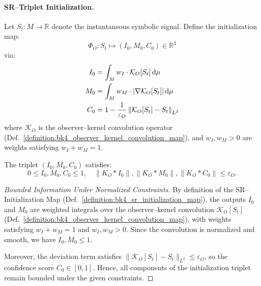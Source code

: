 \paragraph{SR--Triplet Initialization.}
\begin{definition}
\label{definition:bk4_sr_initialization_map}

Let $S_t \colon M \to \mathbb{R}$ denote the instantaneous symbolic signal.  
Define the initialization map:
\[
\Phi_O \colon S_t \longmapsto (I_0, M_0, C_0) \in \mathbb{R}^3
\]
via:
\begin{align}
I_0 &= \int_M w_I \cdot \mathcal{K}_O[S_t]\, \mathrm{d}\mu \notag \\
M_0 &= \int_M w_M \cdot |\nabla \mathcal{K}_O[S_t]|\, \mathrm{d}\mu \notag \\
C_0 &= 1 - \frac{1}{\varepsilon_O} \left\| \mathcal{K}_O[S_t] - S_t \right\|_{L^2} \notag
\end{align}
where $\mathcal{K}_O$ is the observer–kernel convolution operator (Def.~\ref{definition:bk4_observer_kernel_convolution_map}), and $w_I, w_M > 0$ are weights satisfying $w_I + w_M = 1$.
\end{definition}
\begin{proposition}
\label{prop:bk4_bounded_sr_initial_state}
The triplet $(I_0, M_0, C_0)$ satisfies:
\[
0 \leq I_0, M_0, C_0 \leq 1, \quad
\|K_O * I_0\|, \|K_O * M_0\|, \|K_O * C_0\| \leq \varepsilon_O.
\]
\end{proposition}
\begin{proof}[Bounded Information Under Normalized Constraints]
\label{proof:bk4_normalization_bounds}
By definition of the SR--Initialization Map (Def.~\ref{definition:bk4_sr_initialization_map}),
the outputs $I_0$ and $M_0$ are weighted integrals over the observer–kernel convolution
$\mathcal{K}_O[S_t]$ (Def.~\ref{definition:bk4_observer_kernel_convolution_map}), with weights satisfying $w_I + w_M = 1$ and $w_I, w_M > 0$. Since the convolution is normalized and smooth, we have \( I_0, M_0 \leq 1 \).

Moreover, the deviation term satisfies $\| \mathcal{K}_O[S_t] - S_t \|_{L^2} \leq \varepsilon_O$, so the confidence score $C_0 \in [0, 1]$. Hence, all components of the initialization triplet remain bounded under the given constraints.
\end{proof}
